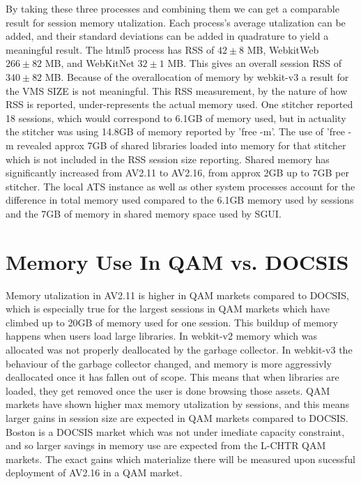 \documentclass{article}
\begin{document}
By taking these three processes and combining them we can get a comparable result for session memory utalization. Each process's average utalization can be added, and their standard deviations can be added in quadrature to yield a meaningful result. The html5 process has RSS of $42 \pm 8$ MB, WebkitWeb $266 \pm 82$ MB, and WebKitNet $32 \pm 1$ MB. This gives an overall session RSS of $340 \pm 82$ MB. Because of the overallocation of memory by webkit-v3 a result for the VMS SIZE is not meaningful. This RSS measurement, by the nature of how RSS is reported, under-represents the actual memory used. One stitcher reported 18 sessions, which would correspond to 6.1GB of memory used, but in actuality the stitcher was using 14.8GB of memory reported by 'free -m'. The use of 'free -m revealed approx 7GB of shared libraries loaded into memory for that stitcher which is not included in the RSS session size reporting. Shared memory has significantly increased from AV2.11 to AV2.16, from approx 2GB up to 7GB per stitcher. The local ATS instance as well as other system processes account for the difference in total memory used compared to the 6.1GB memory used by sessions and the 7GB of memory in shared memory space used by SGUI. 



\section{Memory Use In QAM vs. DOCSIS}
\label{SECTION-QAMDOCSIS}

Memory utalization in AV2.11 is higher in QAM markets compared to DOCSIS, which is especially true for the largest sessions in QAM markets which have climbed up to 20GB of memory used for one session. This buildup of memory happens when users load large libraries. In webkit-v2 memory which was allocated was not properly deallocated by the garbage collector. In webkit-v3 the behaviour of the garbage collector changed, and memory is more aggressivly deallocated once it has fallen out of scope. This means that when libraries are loaded, they get removed once the user is done browsing those assets. QAM markets have shown higher max memory utalization by sessions, and this means larger gains in session size are expected in QAM markets compared to DOCSIS. Boston is a DOCSIS market which was not under imediate capacity constraint, and so larger savings in memory use are expected from the L-CHTR QAM markets. The exact gains which materialize there will be measured upon sucessful deployment of AV2.16 in a QAM market. 
\end{document}
